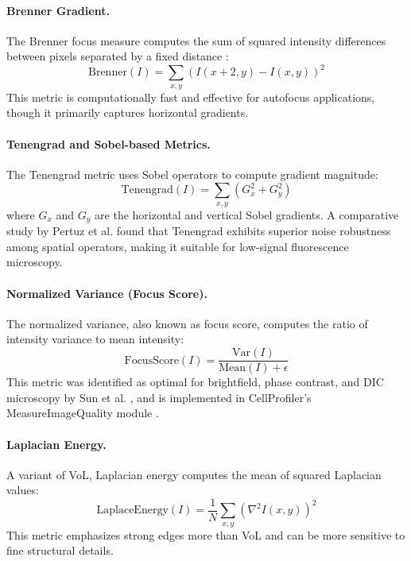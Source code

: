 \paragraph{Brenner Gradient.}
The Brenner focus measure computes the sum of squared intensity differences between pixels separated by a fixed distance \cite{brenner1976automated}:
\begin{equation}
    \text{Brenner}(I) = \sum_{x,y} \left(I(x+2, y) - I(x, y)\right)^2
\end{equation}
This metric is computationally fast and effective for autofocus applications, though it primarily captures horizontal gradients.

\paragraph{Tenengrad and Sobel-based Metrics.}
The Tenengrad metric uses Sobel operators to compute gradient magnitude:
\begin{equation}
    \text{Tenengrad}(I) = \sum_{x,y} \left(G_x^2 + G_y^2\right)
\end{equation}
where $G_x$ and $G_y$ are the horizontal and vertical Sobel gradients. A comparative study by Pertuz et al. \cite{pertuz2013analysis} found that Tenengrad exhibits superior noise robustness among spatial operators, making it suitable for low-signal fluorescence microscopy.

\paragraph{Normalized Variance (Focus Score).}
The normalized variance, also known as focus score, computes the ratio of intensity variance to mean intensity:
\begin{equation}
    \text{FocusScore}(I) = \frac{\text{Var}(I)}{\text{Mean}(I) + \epsilon}
\end{equation}
This metric was identified as optimal for brightfield, phase contrast, and DIC microscopy by Sun et al. \cite{sun2004autofocusing}, and is implemented in CellProfiler's MeasureImageQuality module \cite{carpenter2006cellprofiler}.

\paragraph{Laplacian Energy.}
A variant of VoL, Laplacian energy computes the mean of squared Laplacian values:
\begin{equation}
    \text{LaplaceEnergy}(I) = \frac{1}{N}\sum_{x,y} \left(\nabla^2 I(x,y)\right)^2
\end{equation}
This metric emphasizes strong edges more than VoL and can be more sensitive to fine structural details.

